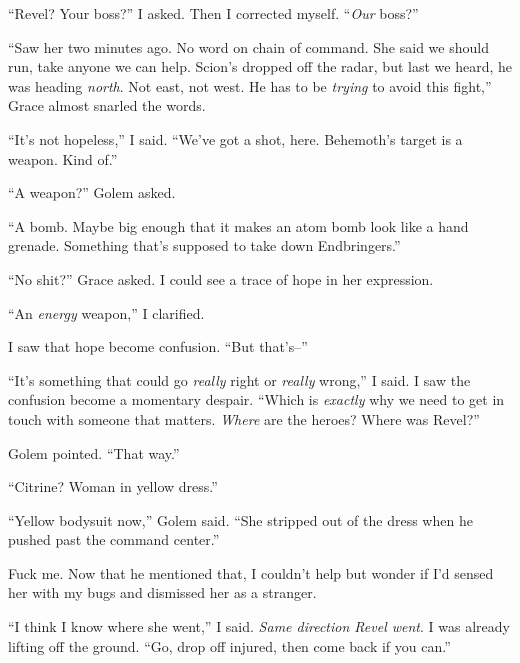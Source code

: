 ``Revel?  Your boss?''  I asked.  Then I corrected myself.  ``\emph{Our }boss?''



``Saw her two minutes ago.  No word on chain of command.  She said we should run, take anyone we can help.  Scion's dropped off the radar, but last we heard, he was heading \emph{north}.  Not east, not west.  He has to be \emph{trying} to avoid this fight,'' Grace almost snarled the words.



``It's not hopeless,'' I said.  ``We've got a shot, here.  Behemoth's target is a weapon.  Kind of.''



``A weapon?'' Golem asked.



``A bomb.  Maybe big enough that it makes an atom bomb look like a hand grenade.  Something that's supposed to take down Endbringers.''



``No shit?''  Grace asked.  I could see a trace of hope in her expression.



``An \emph{energy} weapon,'' I clarified.



I saw that hope become confusion.  ``But that's--''



``It's something that could go \emph{really} right or \emph{really} wrong,'' I said.  I saw the confusion become a momentary despair.  ``Which is \emph{exactly} why we need to get in touch with someone that matters.  \emph{Where} are the heroes?  Where was Revel?''



Golem pointed.  ``That way.''



``Citrine?  Woman in yellow dress.''



``Yellow bodysuit now,'' Golem said.  ``She stripped out of the dress when he pushed past the command center.''



Fuck me.  Now that he mentioned that, I couldn't help but wonder if I'd sensed her with my bugs and dismissed her as a stranger.



``I think I know where she went,'' I said.  \emph{Same direction Revel went}.  I was already lifting off the ground.  ``Go, drop off injured, then come back if you can.''



